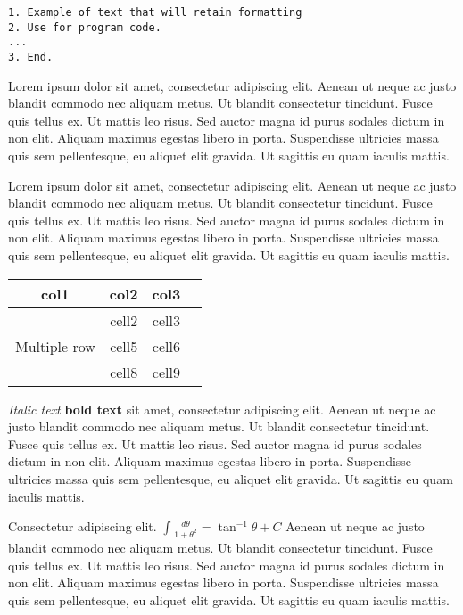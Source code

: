 \documentclass{csmagazine}
\begin{document}
\begin{verbatim}
1. Example of text that will retain formatting
2. Use for program code.
...
3. End.
\end{verbatim}

Lorem ipsum dolor sit amet, consectetur adipiscing elit. Aenean ut neque ac justo blandit commodo nec aliquam metus. Ut blandit consectetur tincidunt. Fusce quis tellus ex. Ut mattis leo risus. Sed auctor magna id purus sodales dictum in non elit. Aliquam maximus egestas libero in porta. Suspendisse ultricies massa quis sem pellentesque, eu aliquet elit gravida. Ut sagittis eu quam iaculis mattis.

Lorem ipsum dolor sit amet, consectetur adipiscing elit. Aenean ut neque ac justo blandit commodo nec aliquam metus. Ut blandit consectetur tincidunt. Fusce quis tellus ex. Ut mattis leo risus. Sed auctor magna id purus sodales dictum in non elit. Aliquam maximus egestas libero in porta. Suspendisse ultricies massa quis sem pellentesque, eu aliquet elit gravida. Ut sagittis eu quam iaculis mattis.


\begin{table}[h!]
	\begin{center}
		\begin{tabular}{ |c|c|c|c| } 
			\hline
			col1 & col2 & col3 \\
			\hline
			\multirow{3}{4em}{Multiple row} & cell2 & cell3 \\ 
			& cell5 & cell6 \\ 
			& cell8 & cell9 \\ 
			\hline
		\end{tabular}
	\end{center}
\end{table}

\textit{Italic text} \textbf{bold text} sit amet, consectetur adipiscing elit. Aenean ut neque ac justo blandit commodo nec aliquam metus. Ut blandit consectetur tincidunt. Fusce quis tellus ex. Ut mattis leo risus. Sed auctor magna id purus sodales dictum in non elit. Aliquam maximus egestas libero in porta. Suspendisse ultricies massa quis sem pellentesque, eu aliquet elit gravida. Ut sagittis eu quam iaculis mattis.

Consectetur adipiscing elit. $\int\frac{d\theta} {1+\theta^2}=\tan^{-1} \theta+C$ Aenean ut neque ac justo blandit commodo nec aliquam metus. Ut blandit consectetur tincidunt. Fusce quis tellus ex. Ut mattis leo risus. Sed auctor magna id purus sodales dictum in non elit. Aliquam maximus egestas libero in porta. Suspendisse ultricies massa quis sem pellentesque, eu aliquet elit gravida. Ut sagittis eu quam iaculis mattis.
\end{document}
